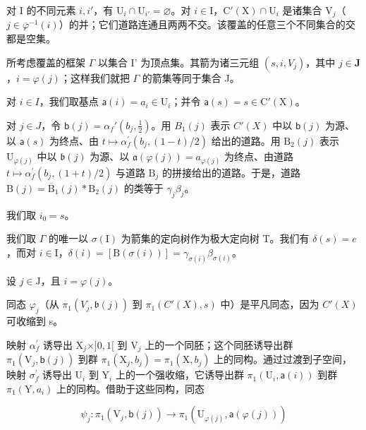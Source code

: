 对 I 的不同元素 \(i, i'\)，有 \(\mathrm{U}_{i} \cap \mathrm{U}_{i'} = \varnothing\)。对 \(i \in \mathrm{I}\)，\(\mathrm{C}'(\mathrm{X}) \cap \mathrm{U}_{i}\) 是诸集合 \(\mathrm{V}_{j}\)（\(j \in \overline{\varphi}^{-1}(i)\)）的并；它们道路连通且两两不交。该覆盖的任意三个不同集合的交都是空集。

所考虑覆盖的框架 \(\Gamma\) 以集合 I' 为顶点集。其箭为诸三元组 \((s, i, V_j)\)，其中 \(j \in \mathbf{J}\)，\(i = \varphi(j)\)；这样我们就把 \(\Gamma\) 的箭集等同于集合 J。

对 \(i \in I\)，我们取基点 \(\mathsf{a}(i) = a_i \in \mathrm{U}_i\)；并令 \(\mathsf{a}(s) = s \in \mathrm{C}'(\mathrm{X})\)。

对 \(j \in J\)，令 \(\mathsf{b}(j) = \alpha_f'(b_j, \frac{1}{2})\)。用 \(B_1(j)\) 表示 \(C'(X)\) 中以 \(\mathsf{b}(j)\) 为源、以 \(\mathsf{a}(s)\) 为终点、由 \(t \mapsto \alpha_{f}^{\prime}(b_{j}, (1 - t)/2)\) 给出的道路。用 \(\mathrm{B}_{2}(j)\) 表示 \(\mathrm{U}_{\varphi(j)}\) 中以 \(\mathfrak{b}(j)\) 为源、以 \(\mathfrak{a}(\varphi(j)) = a_{\varphi(j)}\) 为终点、由道路 \(t \mapsto \alpha_{f}^{\prime}(b_{j}, (1 + t)/2)\) 与道路 \(\mathrm{B}_{j}\) 的拼接给出的道路。于是，道路 \(\mathrm{B}(j) = \overline{\mathrm{B}}_{1}(j) * \mathrm{B}_{2}(j)\) 的类等于 \(\gamma_{j}\beta_{j}\)。

我们取 \(i_{0}=s\)。

我们取 \(\Gamma\) 的唯一以 \(\sigma(\mathrm{I})\) 为箭集的定向树作为极大定向树 T。我们有 \(\delta(s) = e\)，而对 \(i \in \mathrm{I}\)，\(\delta(i) = [\mathrm{B}(\sigma(i))] = \gamma_{\sigma(i)}\beta_{\sigma(i)}\)。

设 \(j \in \mathrm{J}\)，且 \(i = \varphi(j)\)。

同态 \(\varphi_{j}\)（从 \(\pi_1(V_j, \mathfrak{b}(j))\) 到 \(\pi_1(C'(X), s)\) 中）是平凡同态，因为 \(C'(X)\) 可收缩到 s。

映射 \(\alpha_{f}^{\prime}\) 诱导出 \(\mathrm{X}_{j} \times ]0,1[\) 到 \(\mathrm{V}_{j}\) 上的一个同胚；这个同胚诱导出群 \(\pi_{1}(\mathrm{V}_{j},\mathsf{b}(j))\) 到群 \(\pi_{1}(\mathrm{X}_{j},b_{j}) = \pi_{1}(\mathrm{X},b_{j})\) 上的同构。通过过渡到子空间，映射 \(\sigma_{f}^{\prime}\) 诱导出 \(\mathrm{U}_{i}\) 到 \(\mathrm{Y}_{i}\) 上的一个强收缩，它诱导出群 \(\pi_{1}(\mathrm{U}_{i},\mathsf{a}(i))\) 到群 \(\pi_{1}(\mathrm{Y},a_{i})\) 上的同构。借助于这些同构，同态

\[
\psi_ {j} \colon \pi_ {1} (\mathrm{V} _ {j}, \mathsf {b} (j)) \to \pi_ {1} (\mathrm{U} _ {\varphi (j)}, \mathsf {a} (\varphi (j)))
\]

